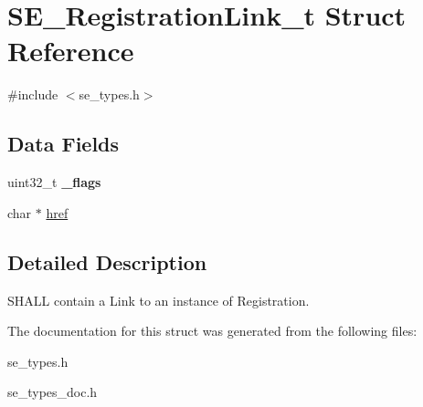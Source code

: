 \hypertarget{structSE__RegistrationLink__t}{}\section{S\+E\+\_\+\+Registration\+Link\+\_\+t Struct Reference}
\label{structSE__RegistrationLink__t}


{\ttfamily \#include $<$se\+\_\+types.\+h$>$}

\subsection*{Data Fields}
\begin{DoxyCompactItemize}
\item 
uint32\+\_\+t {\bfseries \+\_\+flags}
\item 
char $\ast$ \hyperlink{group__RegistrationLink_gafe60311d958b8e03a852890540553df2}{href}
\end{DoxyCompactItemize}


\subsection{Detailed Description}
S\+H\+A\+LL contain a Link to an instance of Registration. 

The documentation for this struct was generated from the following files\+:\begin{DoxyCompactItemize}
\item 
se\+\_\+types.\+h\item 
se\+\_\+types\+\_\+doc.\+h\end{DoxyCompactItemize}
